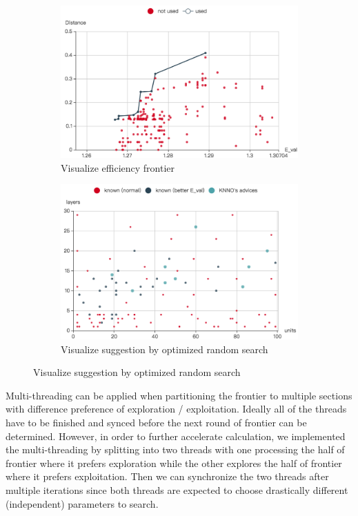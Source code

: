 \documentclass{article}
\begin{document}
\begin{figure}[h]
\begin{subfigure}{.5\textwidth}
  	\centering
  	\includegraphics[width=.8\linewidth]{frontier.png}
  	\caption{Visualize efficiency frontier}
\end{subfigure}
\begin{subfigure}{.5\textwidth}
  	\centering
  	\includegraphics[width=.8\linewidth]{knno.png}
  	\caption{Visualize suggestion by optimized random search}
\end{subfigure}
\end{figure}

Multi-threading can be applied when partitioning the frontier to multiple sections with difference preference of exploration / exploitation. Ideally all of the threads have to be finished and synced before the next round of frontier can be determined. However, in order to further accelerate calculation, we implemented the multi-threading by splitting into two threads with one processing the half of frontier where it prefers exploration while the other explores the half of frontier where it prefers exploitation. Then we can synchronize the two threads after multiple iterations since both threads are expected to choose drastically different (independent) parameters to search.
\end{document}
